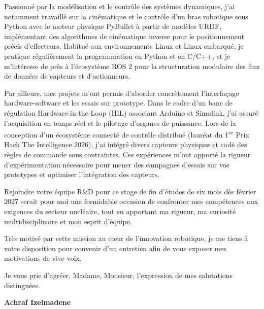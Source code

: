 \documentclass[10pt,a4paper]{altacv}
\begin{document}
Passionné par la modélisation et le contrôle des systèmes dynamiques, j'ai notamment travaillé sur la cinématique et le contrôle d'un bras robotique sous Python avec le moteur physique PyBullet à partir de modèles URDF, implémentant des algorithmes de cinématique inverse pour le positionnement précis d'effecteurs. Habitué aux environnements Linux et Linux embarqué, je pratique régulièrement la programmation en Python et en C/C++, et je m'intéresse de près à l'écosystème ROS 2 pour la structuration modulaire des flux de données de capteurs et d'actionneurs.

Par ailleurs, mes projets m'ont permis d'aborder concrètement l'interfaçage hardware-software et les essais sur prototype. Dans le cadre d'un banc de régulation Hardware-in-the-Loop (HIL) associant Arduino et Simulink, j'ai assuré l'acquisition en temps réel et le pilotage d'organes de puissance. Lors de la conception d'un écosystème connecté de contrôle distribué (lauréat du 1\textsuperscript{er} Prix Hack The Intelligence 2026), j'ai intégré divers capteurs physiques et codé des règles de commande sous contraintes. Ces expériences m'ont apporté la rigueur d'expérimentation nécessaire pour mener des campagnes d'essais sur vos prototypes et optimiser l'intégration des capteurs.

Rejoindre votre équipe R\&D pour ce stage de fin d'études de six mois dès février 2027 serait pour moi une formidable occasion de confronter mes compétences aux exigences du secteur nucléaire, tout en apportant ma rigueur, ma curiosité multidisciplinaire et mon esprit d'équipe.

Très motivé par cette mission au cœur de l'innovation robotique, je me tiens à votre disposition pour convenir d'un entretien afin de vous exposer mes motivations de vive voix.

Je vous prie d'agréer, Madame, Monsieur, l'expression de mes salutations distinguées.

\vspace{16pt}

\begin{flushright}
  \large\color{emphasis}\textbf{Achraf Izelmadene}
\end{flushright}
\end{document}
